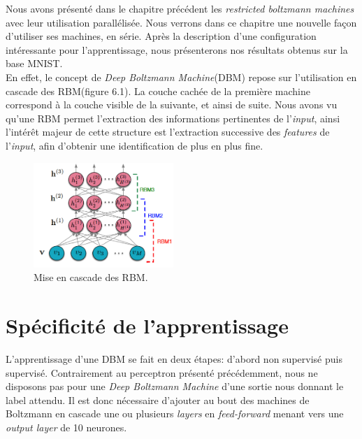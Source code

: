 \documentclass[a4paper,oneside]{report}
\begin{document}
		Nous avons présenté dans le chapitre précédent les \textit{restricted boltzmann machines} avec leur utilisation parallélisée. 
		Nous verrons dans ce chapitre une nouvelle façon d'utiliser ses machines, en série. Après la description d'une configuration intéressante pour l'apprentissage, nous présenterons nos résultats obtenus sur la base MNIST.\\


		En effet, le concept de \textit{Deep Boltzmann Machine}(DBM) repose sur l'utilisation en cascade des RBM(figure 6.1). La couche cachée de la première machine correspond à la couche visible de la suivante, et ainsi de suite. Nous avons vu qu'une RBM permet l'extraction des informations pertinentes de l'\textit{input}, ainsi l'intérêt majeur de cette structure est l'extraction successive des \textit{features} de l'\textit{input}, afin d'obtenir une identification de plus en plus fine.

                \begin{figure}
                    \begin{center}
                        \includegraphics[width=200px]{Images/DBN.png}
                    \end{center}
                    \caption{Mise en cascade des RBM.}
                \end{figure}


	\section{Spécificité de l'apprentissage}


		L'apprentissage d'une DBM se fait en deux étapes: d'abord non supervisé puis supervisé.
		Contrairement au perceptron présenté précédemment, nous ne disposons pas pour une \textit{Deep Boltzmann Machine} d'une sortie nous donnant le label attendu. Il est donc nécessaire d'ajouter au bout des machines de 					Boltzmann en cascade une ou plusieurs\textit{ layers} en \textit{feed-forward} menant vers une \textit{output layer} de 10 neurones.\\
\end{document}
